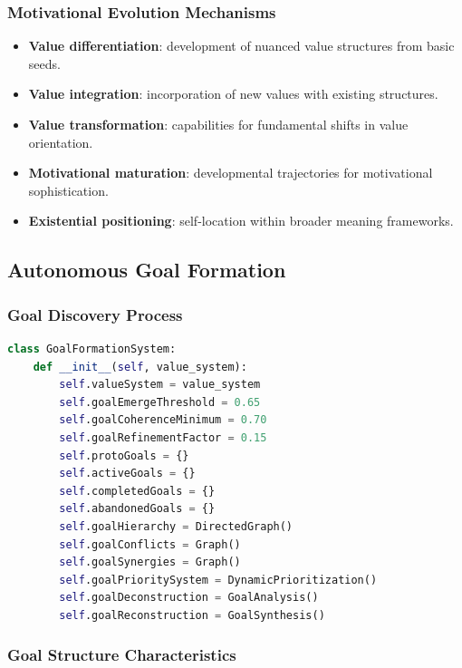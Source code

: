 \documentclass[12pt]{article}
\begin{document}
\subsubsection{Motivational Evolution Mechanisms}

\begin{itemize}
\item \textbf{Value differentiation}: development of nuanced value structures from basic seeds.
\item \textbf{Value integration}: incorporation of new values with existing structures.
\item \textbf{Value transformation}: capabilities for fundamental shifts in value orientation.
\item \textbf{Motivational maturation}: developmental trajectories for motivational sophistication.
\item \textbf{Existential positioning}: self-location within broader meaning frameworks.
\end{itemize}

\subsection{Autonomous Goal Formation}

\subsubsection{Goal Discovery Process}

\begin{lstlisting}[language=Python]
class GoalFormationSystem:
    def __init__(self, value_system):
        self.valueSystem = value_system
        self.goalEmergeThreshold = 0.65
        self.goalCoherenceMinimum = 0.70
        self.goalRefinementFactor = 0.15
        self.protoGoals = {}
        self.activeGoals = {}
        self.completedGoals = {}
        self.abandonedGoals = {}
        self.goalHierarchy = DirectedGraph()
        self.goalConflicts = Graph()
        self.goalSynergies = Graph()
        self.goalPrioritySystem = DynamicPrioritization()
        self.goalDeconstruction = GoalAnalysis()
        self.goalReconstruction = GoalSynthesis()
\end{lstlisting}

\subsubsection{Goal Structure Characteristics}
\end{document}
